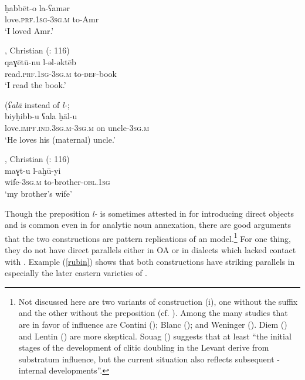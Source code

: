 \documentclass[output=paper]{langsci/langscibook}
\begin{document}
\ea
{ \citep[144]{Berlinches2016}} \\
\gll ḥabbēt-o la-ʕamər\\
     love.\textsc{prf.1sg}-\textsc{3sg.m} to-Amr\\
\glt ‘I loved Amr.’ \label{damas}
\z

\ea 
{, Christian (\citealt{Abu-Haidar1991}: 116)}\\
\gll  qaɣētū-nu l-əl-əktēb\\
     read.\textsc{prf.1sg}{}-\textsc{3sg.m} to-\textsc{def}{}-book\\
\glt ‘I read the book.’
\z

\ea 
{  (\textit{ʕalā} instead of \textit{l-}; \citealt[158]{Procházka2002Cukurova}}\\
\gll   biyḥibb-u ʕala ḫāl-u\\
     love.\textsc{impf.ind.3sg.m}{}-\textsc{3sg.m} on uncle-\textsc{3sg.m}\\
\glt ‘He loves his (maternal) uncle.’ \label{cilic}
\z

\ea 
{, Christian (\citealt{Abu-Haidar1991}: 116)} \\
\gll maɣt-u l-aḫū-yi\\
     wife\textsc{-3sg.m} to-brother-\textsc{obl.1sg}\\
\glt ‘my brother’s wife’ \label{christ}
\z

Though the {preposition} \textit{l-} is sometimes attested in  for introducing direct objects and is common even in  for analytic noun annexation, there are good arguments that the two constructions are pattern replications of an  model.\footnote{Not discussed here are two variants of construction (i), one without the suffix and the other without the {preposition} (cf. \citealt[203]{Lentin2018}). Among the many studies that are in favor of  influence are Contini (\citeyear[105]{Contini1999}); Blanc (\citeyear[130]{Blanc1964}); and Weninger (\citeyear[750]{Weninger2011Aramaic}). Diem (\citeyear[47--49]{Diem1979}) and Lentin (\citeyear{Lentin2018}) are more skeptical. Souag (\citeyear[52]{Souag2017clitic}) suggests that at least “the initial stages of the development of {clitic doubling} in the Levant derive from  substratum influence, but the current situation also reflects subsequent -internal developments”.} For one thing, they do not have direct parallels either in OA or in dialects which lacked contact with . Example (\ref{rubin}) shows that both constructions have striking parallels in especially the later eastern varieties of  \citep[94--104]{Rubin2005}. 
\end{document}
